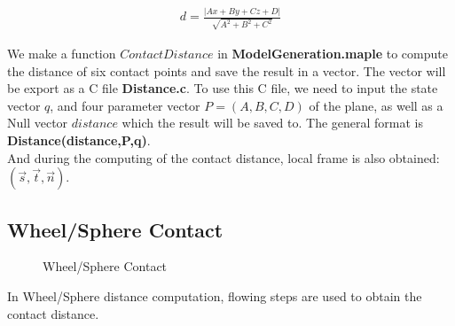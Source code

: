 \begin{eqnarray}
d= \frac{\left| Ax+By+Cz+D \right|}{\sqrt{A^2+B^2+C^2}}
\label{DistanceFormulation}
\end{eqnarray}

We make a function $ContactDistance$ in \textbf{ModelGeneration.maple} to compute the distance of six contact points and save the result in a vector. The vector will be export as a C file \textbf{Distance.c}. To use this C file, we need to input the state vector $q$, and four parameter vector $P=(A,B,C,D)$ of the plane, as well as a Null vector $distance$ which the result will be saved to. The general format is \textbf{Distance(distance,P,q)}.\\

And during the computing of the contact distance, local frame is also obtained: $(\vec{s},\vec{t},\vec{n})$.

\subsection{Wheel/Sphere Contact}

\begin{figure}[H]
\begin{center}
 
\caption{Wheel/Sphere Contact}
\label{Wheel/Sphere Contact}
\end{center}
\end{figure}


In Wheel/Sphere distance computation, flowing steps are used to obtain the contact distance.

